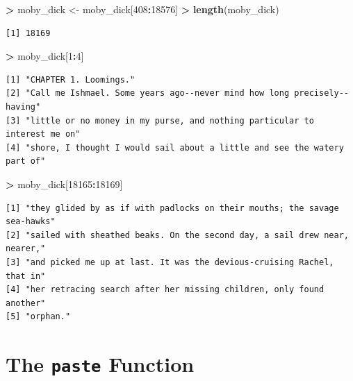 \documentclass[]{krantz}
\makeatletter
\newenvironment{Shaded}{\begin{snugshade}}{\end{snugshade}}
\newcommand{\KeywordTok}[1]{\textcolor[rgb]{0.27,0.27,0.27}{\textbf{#1}}}
\newcommand{\DecValTok}[1]{\textcolor[rgb]{0.06,0.06,0.06}{#1}}
\newcommand{\StringTok}[1]{\textcolor[rgb]{0.5,0.5,0.5}{#1}}
\newcommand{\OperatorTok}[1]{\textcolor[rgb]{0.43,0.43,0.43}{\textbf{#1}}}
\newcommand{\NormalTok}[1]{#1}
\newenvironment{kframe}{%
\medskip{}
\setlength{\fboxsep}{.8em}
 \def\at@end@of@kframe{}%
 \ifinner\ifhmode%
  \def\at@end@of@kframe{\end{minipage}}%
  \begin{minipage}{\columnwidth}%
 \fi\fi%
 \def\FrameCommand##1{\hskip\@totalleftmargin \hskip-\fboxsep
 \colorbox{shadecolor}{##1}\hskip-\fboxsep
     \hskip-\linewidth \hskip-\@totalleftmargin \hskip\columnwidth}%
 \MakeFramed {\advance\hsize-\width
   \@totalleftmargin\z@ \linewidth\hsize
   \@setminipage}}%
 {\par\unskip\endMakeFramed%
 \at@end@of@kframe}
\renewenvironment{Shaded}{\begin{kframe}}{\end{kframe}}
\makeatother
\begin{document}
\begin{Shaded}
\begin{Highlighting}[]
\OperatorTok{>}\StringTok{ }\NormalTok{moby_dick <-}\StringTok{ }\NormalTok{moby_dick[}\DecValTok{408}\OperatorTok{:}\DecValTok{18576}\NormalTok{]}
\OperatorTok{>}\StringTok{ }\KeywordTok{length}\NormalTok{(moby_dick)}
\end{Highlighting}
\end{Shaded}

\begin{verbatim}
[1] 18169
\end{verbatim}

\begin{Shaded}
\begin{Highlighting}[]
\OperatorTok{>}\StringTok{ }\NormalTok{moby_dick[}\DecValTok{1}\OperatorTok{:}\DecValTok{4}\NormalTok{]}
\end{Highlighting}
\end{Shaded}

\begin{verbatim}
[1] "CHAPTER 1. Loomings."                                                    
[2] "Call me Ishmael. Some years ago--never mind how long precisely--having"  
[3] "little or no money in my purse, and nothing particular to interest me on"
[4] "shore, I thought I would sail about a little and see the watery part of" 
\end{verbatim}

\begin{Shaded}
\begin{Highlighting}[]
\OperatorTok{>}\StringTok{ }\NormalTok{moby_dick[}\DecValTok{18165}\OperatorTok{:}\DecValTok{18169}\NormalTok{]}
\end{Highlighting}
\end{Shaded}

\begin{verbatim}
[1] "they glided by as if with padlocks on their mouths; the savage sea-hawks"
[2] "sailed with sheathed beaks. On the second day, a sail drew near, nearer,"
[3] "and picked me up at last. It was the devious-cruising Rachel, that in"   
[4] "her retracing search after her missing children, only found another"     
[5] "orphan."                                                                 
\end{verbatim}

\section{\texorpdfstring{The \texttt{paste}
Function}{The paste Function}}\label{the-paste-function}
\end{document}
